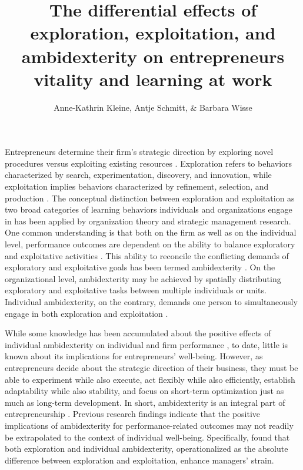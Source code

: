 \documentclass[man]{apa7}
\title{The differential effects of exploration, exploitation, and ambidexterity on entrepreneurs vitality and learning at work}
\author{Anne-Kathrin Kleine, Antje Schmitt, \& Barbara Wisse}
\affiliation{University of Groningen}
\begin{document}
\maketitle

Entrepreneurs determine their firm's strategic direction by exploring novel procedures versus exploiting existing resources \parencite{Siren.2012, Ireland2009, Webb2010}.
Exploration refers to behaviors characterized by search, experimentation, discovery, and innovation, while exploitation implies behaviors characterized by refinement, selection, and production \parencite{March.1991}.
The conceptual distinction between exploration and exploitation as two broad categories of learning behaviors individuals and organizations engage in has been applied by organization theory \parencite[e.g.,][]{OReilly2013} and strategic management \parencite[e.g.,][]{Raisch.2009b} research.
One common understanding is that both on the firm as well as on the individual level, performance outcomes are dependent on the ability to balance exploratory and exploitative activities \parencite[e.g.,][]{Tushman1996, Mom.2007, Raisch.2009b}.
This ability to reconcile the conflicting demands of exploratory and exploitative goals has been termed ambidexterity \parencite{March.1991}. 
On the organizational level, ambidexterity may be achieved by spatially distributing exploratory and exploitative tasks between multiple individuals or units. 
Individual ambidexterity, on the contrary, demands one person to simultaneously engage in both exploration and exploitation \parencite{He2004, Good.2013}. \par 

While some knowledge has been accumulated about the positive effects of individual ambidexterity on individual and firm performance \parencite[e.g.,][]{Rosing.2017, Vicentini.2019, Mom.2018}, to date, little is known about its implications for entrepreneurs' well-being. 
However, as entrepreneurs decide about the strategic direction of their business, they must be able to experiment while also execute, act flexibly while also efficiently, establish adaptability while also stability, and focus on short-term optimization just as much as long-term development.
In short, ambidexterity is an integral part of entrepreneurship \parencite{Volery.2015}. 
Previous research findings indicate that the positive implications of ambidexterity for performance-related outcomes may not readily be extrapolated to the context of individual well-being. 
Specifically, \textcite{Keller2015} found that both exploration and individual ambidexterity, operationalized as the absolute difference between exploration and exploitation, enhance managers' strain. \par 
\end{document}
